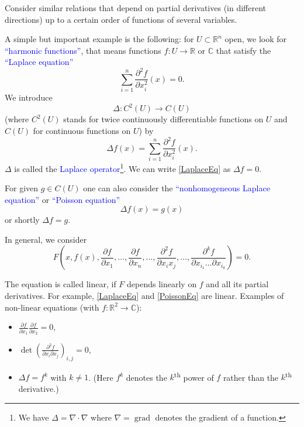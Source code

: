 \documentclass[12pt, oneside, a4paper]{article}
\theoremstyle{dfn}
\def\Rbb{\ensuremath{\mathbb{R}}}
\newcommand{\Com}{\mathbb{C}}
\begin{document}
Consider similar relations that depend on partial derivatives (in different directions) up to a certain order of functions of several variables.

A simple but important example is the following: for $U \subset \Rbb^n$ open, we look for \textcolor{blue}{``harmonic functions''}, that means functions $f: U \to \Rbb$ or $\Com$ that satisfy the \textcolor{blue}{``Laplace equation''}
\begin{equation}
\sum_{i=1}^{n} \frac{\partial^2 f}{\partial x_i^2} (x) = 0.
\label{LaplaceEq}
\end{equation}
We introduce
\[
\Delta: C^2(U) \to C(U)
\]
(where $C^2(U)$ stands for twice continuously differentiable functions on $U$ and $C(U)$ for continuous functions on $U$) by
\[
\Delta f(x) = \sum_{i=1}^n \frac{\partial^2 f}{\partial x_i^2} (x).
\]
$\Delta$ is called the \textcolor{blue}{Laplace operator}\footnote{We have $\Delta = \nabla \cdot \nabla$ where $\nabla = \operatorname{grad}$ denotes the gradient of a function.}. We can write \eqref{LaplaceEq} as $\Delta f = 0$.

For given $g \in C(U)$ one can also consider the \textcolor{blue}{``nonhomogeneous Laplace equation''} or \textcolor{blue}{``Poisson equation''}
\begin{equation}
\Delta f(x) = g(x)
\label{PoissonEq}
\end{equation}
or shortly $\Delta f = g$.

In general, we consider
\begin{equation}
F\left(x, f(x), \frac{\partial f}{\partial x_1}, \ldots, \frac{\partial f}{\partial x_n}, \ldots, \frac{\partial^2 f}{\partial x_i x_j}, \ldots, \frac{\partial^k f}{\partial x_{i_1} \ldots \partial x_{i_k}}\right) = 0.
\label{GeneralPDE}
\end{equation}

The equation is called linear, if $F$ depends linearly on $f$ and all its partial derivatives.
For example, \eqref{LaplaceEq} and \eqref{PoissonEq} are linear. Examples of non-linear equations (with $f : \Rbb^2 \to \Com$):
\begin{itemize}
	\item $\frac{\partial f}{\partial x_1} \frac{\partial f}{\partial x_2} = 0$,
	\item $\det \left( \frac{\partial^2 f}{\partial x_i \partial x_j} \right)_{i,j} = 0$,
	\item $\Delta f = f^k$ with $k \neq 1$. (Here $f^k$ denotes the $k$\textsuperscript{th} power of $f$ rather than the $k$\textsuperscript{th} derivative.)
\end{itemize}
\end{document}
